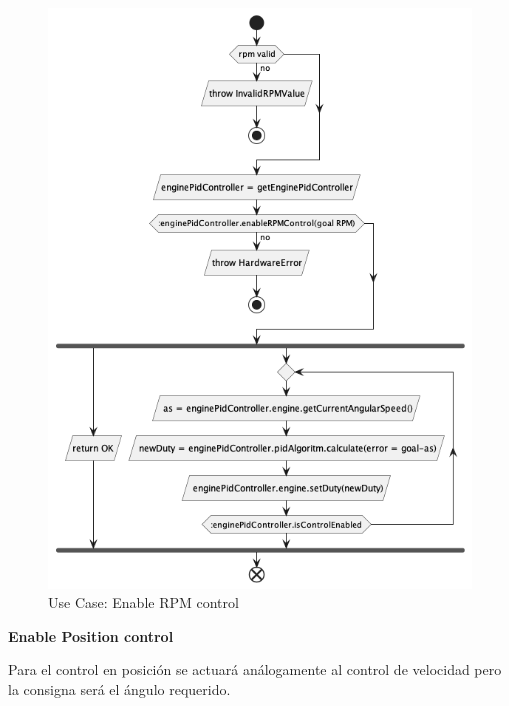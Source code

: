 \begin{figure}[H]
    \centering
    \includegraphics[height=0.6\textheight]{./part/Proyecto_ejecutivo/memoria_descriptiva/descripcionDelProyecto/control/uml/enableRPMControl}
    \caption{Use Case: Enable RPM control}\label{fig:Use Case- Enable RPM control}
\end{figure}

\newpage
\textbf{Enable Position control}

Para el control en posición se actuará análogamente al control de velocidad pero la consigna será el ángulo requerido.

